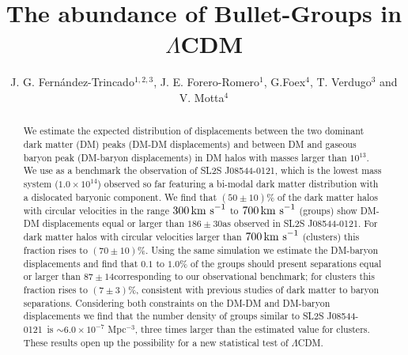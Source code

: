 \documentclass{emulateapj}
\newcommand{\hkpc}{{\ifmmode{h^{-1}{\rm kpc}}\else{$h^{-1}$kpc }\fi}}
\newcommand{\hMsun}{{\ifmmode{h^{-1}{\rm {M_{\odot}}}}\else{$h^{-1}{\rm{M_{\odot}}}$}\fi}}
\newcommand{\kms}{{\ifmmode{{\mathrm{\,km\ s}^{-1}}}\else{\,km~s$^{-1}$}\fi}}
\newcommand{\bullg}{SL2S J08544-0121}
\begin{document}
 

\title{The abundance of Bullet-Groups in $\Lambda$CDM}
\author{J. G. Fern\'andez-Trincado$^{1,2,3}$, J. E. Forero-Romero$^1$,
  G.Foex$^4$, T. Verdugo$^3$ and V. Motta$^4$} 
\begin{abstract}

We estimate the expected distribution of displacements between the two
dominant dark matter (DM) peaks (DM-DM displacements) and between
DM and gaseous baryon peak (DM-baryon displacements) in DM halos 
with masses larger than $10^{13}$\hMsun. We use as a benchmark the
observation of \bullg, which is the lowest mass system ($1.0\times
10^{14}$\hMsun) observed so far
featuring a bi-modal dark matter distribution with a dislocated
baryonic component. We find that $(50 \pm 10)\%$ of the dark matter
halos with circular velocities in the range $300\kms$ to $700\kms$
(groups) show DM-DM displacements equal or larger than $186 \pm
30$\hkpc as observed in \bullg. For dark matter halos with circular
velocities larger than $700\kms$ (clusters) this fraction rises to
$(70 \pm 10)\%$. Using the same simulation we estimate the DM-baryon
displacements and find that $0.1$ to $1.0\%$ of the groups should
present separations equal or larger than $87\pm 14$\hkpc corresponding
to our observational benchmark; for clusters this fraction rises to
$(7\pm 3)\%$, consistent with previous studies of dark matter to
baryon separations. Considering both constraints on the DM-DM and
DM-baryon displacements we find that the number density of groups
similar to \bullg\ is $\sim 6.0\times 10^{-7}$ Mpc$^{-3}$, three times
larger than the estimated value for clusters. These results open up
the possibility for a new statistical test of $\Lambda$CDM.
\end{abstract}

\end{document}
